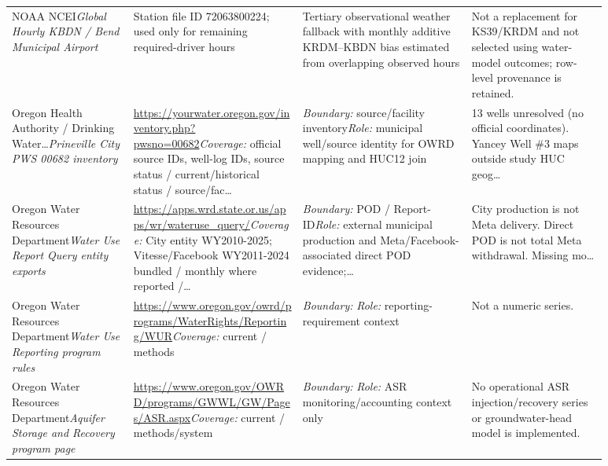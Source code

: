 \documentclass[11pt]{article}
\newcommand{\latesttxt}[1]{\textcolor{purple!85!black}{#1}}
\begin{document}
\begin{longtable}{@{}p{0.18\linewidth}p{0.25\linewidth}p{0.25\linewidth}p{0.20\linewidth}@{}}
\latesttxt{NOAA NCEI\newline \textit{Global Hourly KBDN / Bend Municipal Airport}} & \latesttxt{Station file ID 72063800224; used only for remaining required-driver hours} & \latesttxt{Tertiary observational weather fallback with monthly additive KRDM--KBDN bias estimated from overlapping observed hours} & \latesttxt{Not a replacement for KS39/KRDM and not selected using water-model outcomes; row-level provenance is retained.}\\
Oregon Health Authority / Drinking Water\ldots\newline \textit{Prineville City PWS 00682 inventory} & \url{https://yourwater.oregon.gov/inventory.php?pwsno=00682}\newline \textit{Coverage:} official source IDs, well-log IDs, source status / current/historical status / source/fac\ldots & \textit{Boundary:} source/facility inventory\newline \textit{Role:} municipal well/source identity for OWRD mapping and HUC12 join & 13 wells unresolved (no official coordinates). Yancey Well \#3 maps outside study HUC geog\ldots\\
Oregon Water Resources Department\newline \textit{Water Use Report Query entity exports} & \url{https://apps.wrd.state.or.us/apps/wr/wateruse_query/}\newline \textit{Coverage:} City entity WY2010-2025; Vitesse/Facebook WY2011-2024 bundled / monthly where reported /\ldots & \textit{Boundary:} POD / Report-ID\newline \textit{Role:} external municipal production and Meta/Facebook-associated direct POD evidence;\ldots & City production is not Meta delivery. Direct POD is not total Meta withdrawal. Missing mo\ldots\\
Oregon Water Resources Department\newline \textit{Water Use Reporting program rules} & \url{https://www.oregon.gov/owrd/programs/WaterRights/Reporting/WUR}\newline \textit{Coverage:} current / methods & \textit{Boundary:} \newline \textit{Role:} reporting-requirement context & Not a numeric series.\\
Oregon Water Resources Department\newline \textit{Aquifer Storage and Recovery program page} & \url{https://www.oregon.gov/OWRD/programs/GWWL/GW/Pages/ASR.aspx}\newline \textit{Coverage:} current / methods/system & \textit{Boundary:} \newline \textit{Role:} ASR monitoring/accounting context only & No operational ASR injection/recovery series or groundwater-head model is implemented.\\

\end{longtable}
\end{document}
